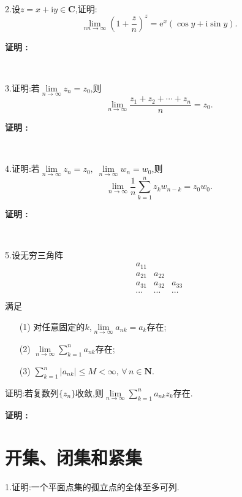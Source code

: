 \documentclass[12pt,fontset=none]{ctexbook}
\newenvironment{proof}[1][]{\par \noindent \textbf{\hspace{2em}证明 \vspace{0.1mm} #1 :}}{\par}
\renewcommand{\i}{\mathrm{i}}
\newcommand{\e}{\mathrm{e}}
\begin{document}
\

2.设$z=x+\i y \in \mathbf{C}$,证明:
$$\lim\limits_{nn \to \infty}\left(1+\frac{z}{n}\right)^{z}= \e^{x}(\cos y+ \i \sin y) .$$
\begin{proof}
  
\end{proof}

\

3.证明:若$\lim\limits_{n\to \infty}z_{n}=z_{0}$,则
$$\lim\limits_{n \to \infty }\frac{z_{1}+z_{2}+\cdots+z_{n}}{n}=z_{0}.$$
\begin{proof}
  
\end{proof}

\

4.证明:若$\lim\limits_{n \to \infty}z_{n}=z_{0},\;\lim\limits_{n \to \infty}w_{n}=w_{0}$,则
$$\lim\limits_{n \to \infty}\frac{1}{n}\sum\limits_{k=1}^{n}z_{k}w_{n-k}=z_{0}w_{0}.$$
\begin{proof}
  
\end{proof}

\

5.设无穷三角阵
$$
\begin{matrix}
  a_{11} & & \\
  a_{21} & a_{22} & \\
  a_{31} & a_{32} & a_{33}\\
  \cdots & \cdots & \cdots \\
\end{matrix}
$$
满足\begin{enumerate}
  \item [(1)] 对任意固定的$k$,$\lim\limits_{n \to \infty}a_{nk}=a_{k}$存在;
  \item [(2)] $\lim\limits_{n \to \infty}\sum\limits_{k=1}^{n}a_{nk}$存在;
  \item [(3)] $\sum\limits_{k=1}^{n}|a_{nk}| \leqslant M < \infty,\,\forall \, n \in \mathbf{N}$.
\end{enumerate}
证明:若复数列$\{z_{n}\}$收敛,则$\lim\limits_{n \to \infty}\sum\limits_{k=1}^{n}a_{nk}z_{k}$存在.
\begin{proof}
  
\end{proof}




\newpage
\section{开集、闭集和紧集}
1.证明:一个平面点集的孤立点的全体至多可列.
\end{document}
